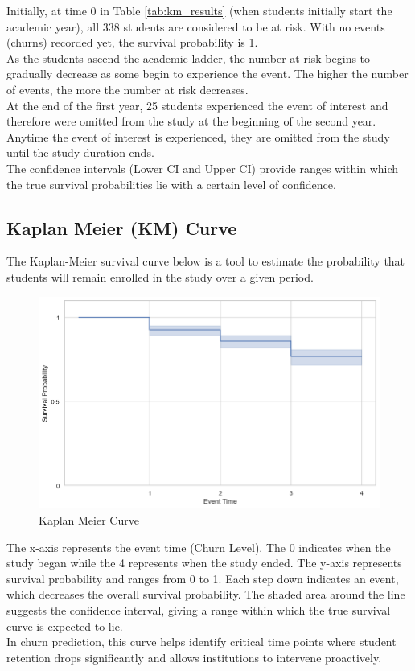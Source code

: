 \documentclass[doublespacing,12pt]{report}
\begin{document}
\noindent Initially, at time 0 in Table \ref{tab:km_results} (when students initially start the academic year), all 338 students are considered to be at risk. With no events (churns) recorded yet, the survival probability is 1.\\
As the students ascend the academic ladder, the number at risk begins to gradually decrease as some begin to experience the event. The higher the number of events, the more the number at risk decreases. \\
At the end of the first year, 25 students experienced the event of interest and therefore were omitted from the study at the beginning of the second year. Anytime the event of interest is experienced, they are omitted from the study until the study duration ends.\\
The confidence intervals (Lower CI and Upper CI) provide ranges within which the true survival probabilities lie with a certain level of confidence.

\subsection{Kaplan Meier (KM) Curve}

The Kaplan-Meier survival curve below is a tool to estimate the probability that students will remain enrolled in the study over a given period. 
\begin{figure}[H]
    \centering
    \includegraphics[width=1\linewidth]{Figure 4/4.1.png}
    \caption{Kaplan Meier Curve}
\end{figure}
\noindent  The x-axis represents the event time (Churn Level). The 0 indicates when the study began while the 4 represents when the study ended. The y-axis represents survival probability and ranges from 0 to 1. Each step down indicates an event, which decreases the overall survival probability.  The shaded area around the line suggests the confidence interval, giving a range within which the true survival curve is expected to lie.\\
In churn prediction, this curve helps identify critical time points where student retention drops significantly and allows institutions to intervene proactively. 
\end{document}
